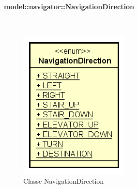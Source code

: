 \documentclass[../DefinizioneDiProdotto.tex]{subfiles}
\begin{document}
\paragraph{model::navigator::NavigationDirection}
\
\begin{figure}[H]
	\centering
	\includegraphics[width=\maxwidth]{img/NavigationDirection.png}
	\caption{Classe NavigationDirection}\label{fig:model::navigator::NavigationDirection} 
\end{figure}
\end{document}
